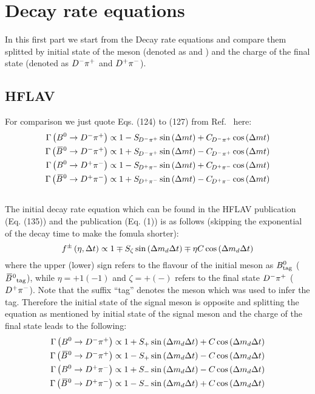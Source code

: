 \section{Decay rate equations}
\label{sec:decrateeq}

In this first part we start from the Decay rate equations and compare them splitted by initial state of the \Bz meson
(denoted as \Bz and \Bzb) and the charge of the final state (denoted as $\f$ and $\fbar$).

\subsection{HFLAV}

For comparison we just quote Eqs. (124) to (127) from Ref.~\cite{Amhis:2016xyh} here:
\begin{align}
\Gamma\left(\Bz\to \f\right)&\propto 1-\Sf\sin\left(\dm t\right)+\Cf\cos\left(\dm t\right) \\
\Gamma\,\big(\Bzb\to \f\big)&\propto 1+\Sf\sin\left(\dm t\right)-\Cf\cos\left(\dm t\right) \\
\Gamma\left(\Bz\to \fbar\right)&\propto 1-\Sfbar\sin\left(\dm t\right)+\Cfbar\cos\left(\dm t\right) \\
\Gamma\,\big(\Bzb\to \fbar\big)&\propto 1+\Sfbar\sin\left(\dm t\right)-\Cfbar\cos\left(\dm t\right)
\end{align}

\subsection{\babar}

The initial decay rate equation which can be found in the HFLAV publication (Eq. (135)) and the \babar publication (Eq. (1)) is
as follows (skipping the exponential of the decay time to make the fomula shorter):
\begin{equation}
f^\pm\left(\eta,\Delta t\right) \propto 1 \mp S_{\zeta}\sin\left(\dmd\Delta t\right)\mp\eta C\cos\left(\dmd\Delta t\right)
\end{equation}
where the upper (lower) sign refers to the flavour of the initial \Bz meson as $\Bz_{\text{tag}}$ ($\Bzb_{\text{tag}}$), while
$\eta=+1 (-1)$ and $\zeta=+(-)$ refers to the final state $\f$ ($\fbar$). Note that the suffix \enquote{tag} denotes the \B meson
which was used to infer the tag. Therefore the initial state of the signal \B meson is opposite and splitting the equation as
mentioned by initial state of the signal \Bz meson and the charge of the final state leads to the following:
\begin{align}
\Gamma\left(\Bz\to \f\right) \propto 1+S_{+}\sin\left(\dmd \Delta t\right)+C\cos\left(\dmd \Delta t\right) \\
\Gamma\,\big(\Bzb\to \f\big) \propto 1-S_{+}\sin\left(\dmd \Delta t\right)-C\cos\left(\dmd \Delta t\right) \\
\Gamma\left(\Bz\to \fbar\right) \propto 1+S_{-}\sin\left(\dmd \Delta t\right)-C\cos\left(\dmd \Delta t\right) \\
\Gamma\,\big(\Bzb\to \fbar\big) \propto 1-S_{-}\sin\left(\dmd \Delta t\right)+C\cos\left(\dmd \Delta t\right)
\end{align}

